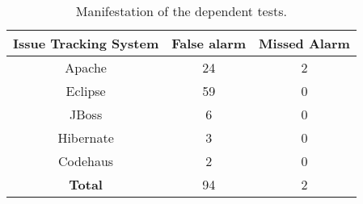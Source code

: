 \begin{table}
\centering
\setlength{\tabcolsep}{0.15\tabcolsep}
\begin{tabular}{|c||c|c|}
\hline
\textbf{Issue Tracking System} & \textbf{False alarm} & \textbf{Missed Alarm} \\
\hline
Apache &24 & 2 \\
\hline
Eclipse & 59 & 0 \\
\hline
JBoss& 6 & 0 \\
\hline
Hibernate & 3 & 0 \\
\hline
Codehaus & 2 & 0 \\
\hline
\hline
\textbf{Total}  & 94 & 2 \\
\hline
\end{tabular}
\caption{
Manifestation of the \dtnum dependent tests.
}
\label{tab:reper}
\end{table}

